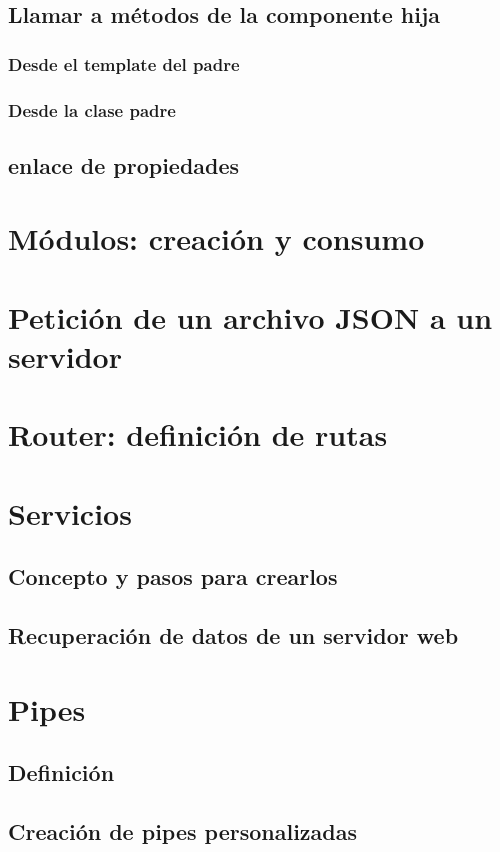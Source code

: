 \documentclass[12pt]{book} %
\begin{document}
\section[Llamar a métodos de la componente hija]{Llamar a métodos de la componente hija}

\subsection{Desde el template del padre}

\subsection{Desde la clase padre}

\section{enlace de propiedades}

\chapter{Módulos: creación y consumo}

\chapter{Petición de un archivo JSON a un servidor}

\chapter{Router: definición de rutas}

\chapter{Servicios}

\section{Concepto y pasos para crearlos}

\section[Recuperación de datos de un servidor web]{Recuperación de datos de un servidor web}

\chapter{Pipes}

\section{Definición}

\section{Creación de pipes personalizadas}
\end{document}

